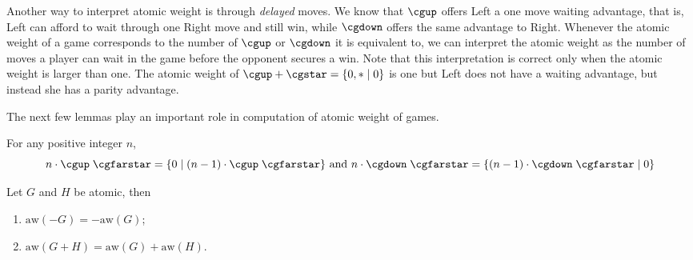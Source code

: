 \documentclass[oneside,reqno]{amsart}
\newcommand{\aw}{\mathrm{aw}}
\begin{document}
    Another way to interpret atomic weight is through {\em delayed} moves. We know that $\cgup$ offers Left a one move waiting  advantage, that is, Left can afford to wait through one Right move and still win, while $\cgdown$ offers the same advantage to Right.  Whenever the atomic weight of a game corresponds to the number of $\cgup$ or $\cgdown$ it is equivalent to, we can interpret the atomic weight as the number of moves a player can wait in the game before the opponent secures a win. Note that this interpretation is correct only when the atomic weight is larger than one. The atomic weight of $\cgup+\cgstar=\{0,*\mid 0\}$ is one but Left does not have a waiting  advantage, but  instead she has a parity advantage.

    
    The next few lemmas play an important role in computation of atomic weight of games.
    
   \begin{lemma}\label{lem: n-cgup-cgfarstar}
        For any positive integer $n$, $$n\cdot\cgup\;\cgfarstar=\{0\mid (n-1)\cdot\cgup\;\cgfarstar\} \text{ and } n\cdot\cgdown\;\cgfarstar=\{(n-1)\cdot\cgdown\;\cgfarstar\mid0\}$$
    \end{lemma}

    \begin{lemma}\label{lem: aw of sum of games}
        Let $G$ and $H$ be atomic, then \begin{enumerate}
            \item $\aw(-G)=-\aw(G)$;
            \item $\aw(G+H)=\aw(G)+\aw(H)$.
        \end{enumerate}
    \end{lemma}
    
\end{document}
